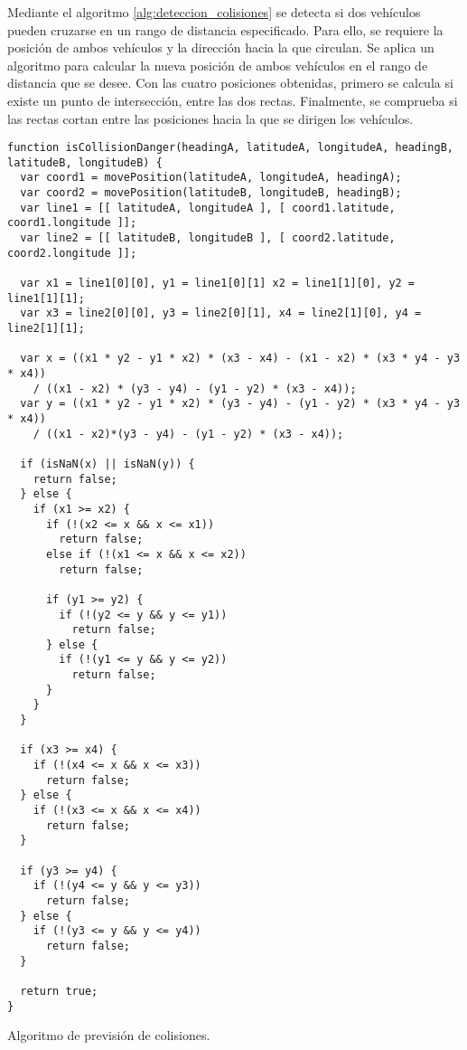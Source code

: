 Mediante el algoritmo \ref{alg:deteccion_colisiones} se detecta si dos vehículos pueden
cruzarse en un rango de distancia especificado. Para ello, se requiere la posición de
ambos vehículos y la dirección hacia la que circulan. Se aplica un algoritmo para calcular
la nueva posición de ambos vehículos en el rango de distancia que se desee. Con las cuatro
posiciones obtenidas, primero se calcula si existe un punto de intersección, entre las dos
rectas. Finalmente, se comprueba si las rectas cortan entre las posiciones hacia la que se
dirigen los vehículos.

\begin{listing}
	\begin{minipage}{.4\textwidth}
		\begin{verbatim}
function isCollisionDanger(headingA, latitudeA, longitudeA, headingB, latitudeB, longitudeB) {
  var coord1 = movePosition(latitudeA, longitudeA, headingA);
  var coord2 = movePosition(latitudeB, longitudeB, headingB);
  var line1 = [[ latitudeA, longitudeA ], [ coord1.latitude, coord1.longitude ]];
  var line2 = [[ latitudeB, longitudeB ], [ coord2.latitude, coord2.longitude ]];

  var x1 = line1[0][0], y1 = line1[0][1] x2 = line1[1][0], y2 = line1[1][1];
  var x3 = line2[0][0], y3 = line2[0][1], x4 = line2[1][0], y4 = line2[1][1];
	
  var x = ((x1 * y2 - y1 * x2) * (x3 - x4) - (x1 - x2) * (x3 * y4 - y3 * x4))
    / ((x1 - x2) * (y3 - y4) - (y1 - y2) * (x3 - x4));
  var y = ((x1 * y2 - y1 * x2) * (y3 - y4) - (y1 - y2) * (x3 * y4 - y3 * x4))
	/ ((x1 - x2)*(y3 - y4) - (y1 - y2) * (x3 - x4));
	
  if (isNaN(x) || isNaN(y)) {
    return false;
  } else {
    if (x1 >= x2) {
      if (!(x2 <= x && x <= x1))
        return false; 
      else if (!(x1 <= x && x <= x2))
        return false; 

      if (y1 >= y2) {
        if (!(y2 <= y && y <= y1))
          return false;
      } else {
        if (!(y1 <= y && y <= y2))
          return false;
      }
    }
  }

  if (x3 >= x4) {
	if (!(x4 <= x && x <= x3)) 
	  return false;
  } else {
    if (!(x3 <= x && x <= x4)) 
      return false;
  }

  if (y3 >= y4) {
    if (!(y4 <= y && y <= y3))
      return false;
  } else {
    if (!(y3 <= y && y <= y4)) 
      return false;
  }

  return true;	
}
	\end{verbatim}
\end{minipage}
\caption{Algoritmo de previsión de colisiones.}\label{alg:deteccion_colisiones}
\end{listing}